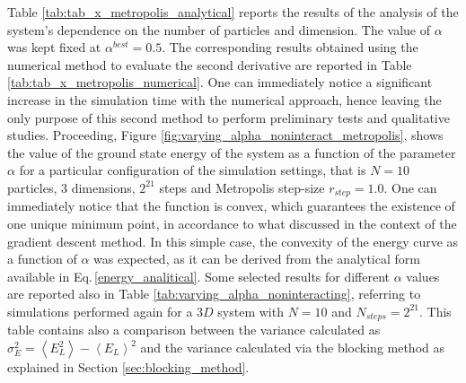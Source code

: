 Table \ref{tab:tab_x_metropolis_analytical} reports the results of the analysis of the system's dependence on the number of particles and dimension. The value of $\alpha$ was kept fixed at $\alpha^{best} = 0.5$. The corresponding results obtained using the numerical method to evaluate the second derivative are reported in Table \ref{tab:tab_x_metropolis_numerical}. One can immediately notice a significant increase in the simulation time with the numerical approach, hence leaving the only purpose of this second method to perform preliminary tests and qualitative studies. Proceeding, Figure \ref{fig:varying_alpha_noninteract_metropolis}, shows the value of the ground state energy of the system as a function of the parameter $\alpha$ for a particular configuration of the simulation settings, that is $N=10$ particles, 3 dimensions, $2^{21}$ steps and Metropolis step-size $r_{step} = 1.0$. One can immediately notice that the function is convex, which guarantees the existence of one unique minimum point, in accordance to what discussed in the context of the gradient descent method. In this simple case, the convexity of the energy curve as a function of $\alpha$ was expected, as it can be derived from the analytical form available in Eq.\,\ref{energy_analitical}. Some selected results for different $\alpha$ values are reported also in Table \ref{tab:varying_alpha_noninteracting}, referring to simulations performed again for a $3D$ system with $N=10$ and $N_{steps}=2^{21}$. This table contains also a comparison between the variance calculated as $\sigma^2_E = \left\langle E_L^2 \right\rangle - \left\langle E_L \right\rangle^2$ and the variance calculated via the blocking method as explained in Section \ref{sec:blocking_method}.

